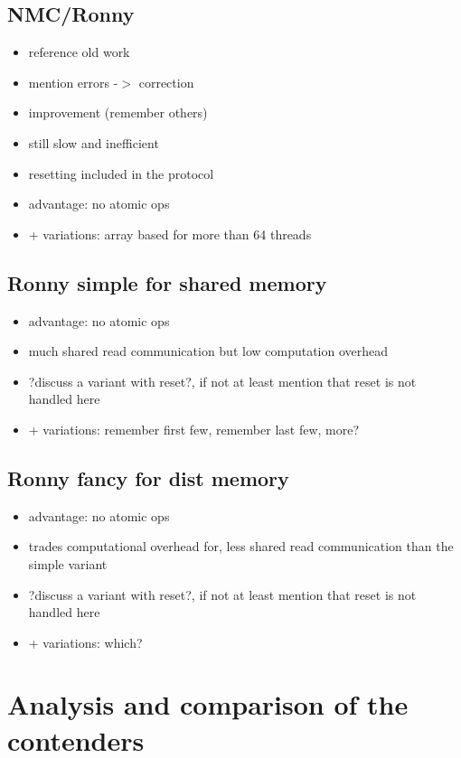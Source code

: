 \documentclass[a4paper, 10pt]{article}
\begin{document}
\subsection{NMC/Ronny}
\begin{itemize}
	\item reference old work
	\item mention errors -$>$ correction
	\item improvement (remember others)
	\item still slow and inefficient
	\item resetting included in the protocol
	\item advantage: no atomic ops
	\item + variations: array based for more than 64 threads
\end{itemize}

\subsection{Ronny simple for shared memory}
\begin{itemize}
	\item advantage: no atomic ops
	\item much shared read communication but low computation overhead
	\item ?discuss a variant with reset?, if not at least mention that reset is not handled here
	\item + variations: remember first few, remember last few, more?
\end{itemize}

\subsection{Ronny fancy for dist memory}
\begin{itemize}
	\item advantage: no atomic ops
	\item trades computational overhead for, less shared read communication than the simple variant
	\item ?discuss a variant with reset?, if not at least mention that reset is not handled here
	\item + variations: which?
\end{itemize}

\section{Analysis and comparison of the contenders}
\end{document}
